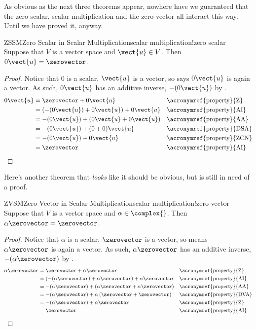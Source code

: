 %
As obvious as the next three theorems appear, nowhere have we guaranteed that the zero scalar, scalar multiplication and the zero vector all interact this way.  Until we have proved it, anyway.
%
\begin{theorem}{ZSSM}{Zero Scalar in Scalar Multiplication}{scalar multiplication!zero scalar}
%
Suppose that $V$ is a vector space and $\vect{u}\in V$.  Then $0\vect{u}=\zerovector$.
%
\end{theorem}
%
\begin{proof}
Notice that $0$ is a scalar, $\vect{u}$ is a vector, so  says $0\vect{u}$ is again a vector.  As such, $0\vect{u}$ has an additive inverse, $-(0\vect{u})$ by .
%
\begin{align*}
0\vect{u}
&=\zerovector+0\vect{u}&&\text{\acronymref{property}{Z}}\\
&=\left(-(0\vect{u}) + 0\vect{u}\right)+0\vect{u}&&\text{\acronymref{property}{AI}}\\
&=-(0\vect{u}) + \left(0\vect{u}+0\vect{u}\right)&&\text{\acronymref{property}{AA}}\\
&=-(0\vect{u}) + (0+0)\vect{u}&&\text{\acronymref{property}{DSA}}\\
&=-(0\vect{u}) + 0\vect{u}&&\text{\acronymref{property}{ZCN}}\\
&=\zerovector&&\text{\acronymref{property}{AI}}
%
\end{align*}
%
\end{proof}
%
Here's another theorem that {\em looks} like it should be obvious, but is still in need of a proof.
%
\begin{theorem}{ZVSM}{Zero Vector in Scalar Multiplication}{scalar multiplication!zero vector}
%
Suppose that $V$ is a vector space and $\alpha\in\complex{\null}$.   Then $\alpha\zerovector=\zerovector$.
%
\end{theorem}
%
\begin{proof}
Notice that $\alpha$ is a scalar, $\zerovector$ is a vector, so  means $\alpha\zerovector$ is again a vector.  As such, $\alpha\zerovector$ has an additive inverse, $-(\alpha\zerovector)$ by .
%
\begin{align*}
\alpha\zerovector
&=\zerovector+\alpha\zerovector&&\text{\acronymref{property}{Z}}\\
&=\left(-(\alpha\zerovector)+\alpha\zerovector\right)+\alpha\zerovector&&\text{\acronymref{property}{AI}}\\
&=-(\alpha\zerovector)+\left(\alpha\zerovector+\alpha\zerovector\right)&&\text{\acronymref{property}{AA}}\\
&=-(\alpha\zerovector)+\alpha\left(\zerovector+\zerovector\right)&&\text{\acronymref{property}{DVA}}\\
&=-(\alpha\zerovector)+\alpha\zerovector&&\text{\acronymref{property}{Z}}\\
&=\zerovector&&\text{\acronymref{property}{AI}}
\end{align*}
%
\end{proof}
